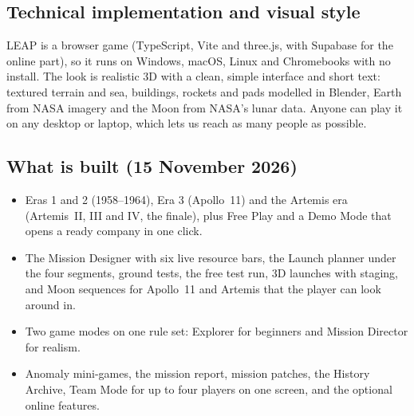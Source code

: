 \documentclass[11pt,a4paper]{article}
\begin{document}
\subsection{Technical implementation and visual style}
LEAP is a browser game (TypeScript, Vite and three.js, with Supabase for the online part), so it runs on Windows,
macOS, Linux and Chromebooks with no install. The look is realistic 3D with a clean, simple interface and short
text: textured terrain and sea, buildings, rockets and pads modelled in Blender, Earth from NASA imagery and the Moon
from NASA's lunar data. Anyone can play it on any desktop or laptop, which lets us reach as many people as possible.

\subsection{What is built (15 November 2026)}
\begin{itemize}
  \item Eras 1 and 2 (1958--1964), Era 3 (Apollo~11) and the Artemis era (Artemis~II, III and IV, the finale), plus
        Free Play and a Demo Mode that opens a ready company in one click.
  \item The Mission Designer with six live resource bars, the Launch planner under the four segments, ground tests,
        the free test run, 3D launches with staging, and Moon sequences for Apollo~11 and Artemis that the player can
        look around in.
  \item Two game modes on one rule set: Explorer for beginners and Mission Director for realism.
  \item Anomaly mini-games, the mission report, mission patches, the History Archive, Team Mode for up to four
        players on one screen, and the optional online features.
\end{itemize}
\end{document}
